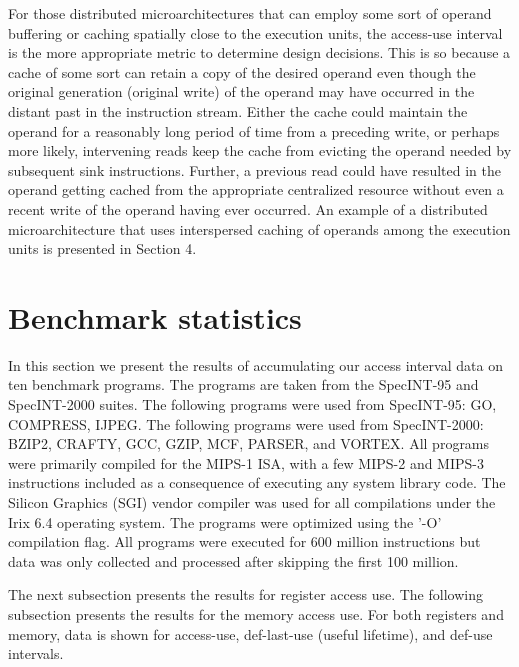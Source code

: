 \documentclass[10pt,dvips]{article}
\begin{document}
For those distributed microarchitectures that can employ
some sort of operand buffering or caching spatially close to
the execution units, the access-use interval is the more appropriate
metric to determine design decisions.
This is so because a cache of some sort can retain a copy of the
desired operand even though the original generation (original write)
of the operand may have occurred in the distant past in the instruction stream.
Either the cache could maintain the operand for a reasonably long
period of time from a preceding write, or perhaps more likely, 
intervening reads keep
the cache from evicting the operand 
needed by subsequent sink instructions.
Further, a previous read could have resulted in the operand getting
cached from the appropriate centralized resource without even a recent 
write of the operand having ever occurred.
An example of a distributed microarchitecture that uses interspersed
caching of operands among the execution units is presented in Section 4.
%
%
\section{Benchmark statistics}
%
In this section we present the results of accumulating our
access interval data on ten benchmark programs.
The programs are taken from the SpecINT-95 and SpecINT-2000
suites.
The following programs were used from SpecINT-95: GO, COMPRESS,
IJPEG.  
The following programs were used from SpecINT-2000:
BZIP2, CRAFTY, GCC, GZIP, MCF, PARSER, and VORTEX.
All programs were primarily compiled for the MIPS-1 ISA,
with a few MIPS-2 and MIPS-3 instructions included as a
consequence of executing any system library code.
The Silicon Graphics (SGI) vendor compiler was used for
all compilations under the Irix 6.4 operating system.
The programs were optimized using the '-O' compilation flag.
All programs were executed for 600 million instructions but
data was only collected and processed after skipping the
first 100 million.

The next subsection presents the results for register access use.
The following subsection presents the results for the memory 
access use.  For both registers and memory, data is shown for 
access-use, def-last-use (useful lifetime), and def-use
intervals.
%
%
\end{document}
